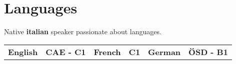 \documentclass[]{cv}
\begin{document}

\section{Languages}
Native \textbf{italian} speaker passionate about languages.\\
\providecommand{\tabularnewline}{\\}
\setlength{\tabcolsep}{5pt}
\begin{tabularx}{\textwidth}{X r | X r | X r }
  \textbf{English} & \textbf{\textcolor{airforceblue}{CAE - C1}} & \textbf{French} & \textbf{\textcolor{airforceblue}{C1}}  & \textbf{German} & \textbf{\textcolor{airforceblue}{\"OSD - B1}} \tabularnewline
\end{tabularx}
\end{document}
